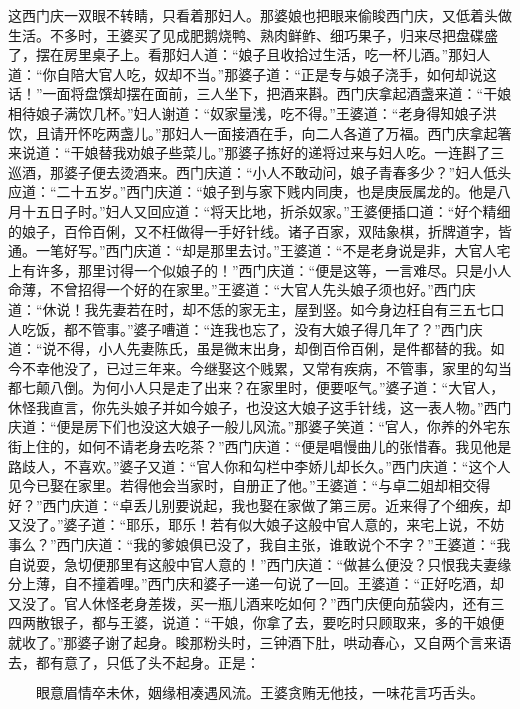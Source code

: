 这西门庆一双眼不转睛，只看着那妇人。那婆娘也把眼来偷睃西门庆，又低着头做生活。不多时，王婆买了见成肥鹅烧鸭、熟肉鲜鲊、细巧果子，归来尽把盘碟盛了，摆在房里桌子上。看那妇人道：“娘子且收拾过生活，吃一杯儿酒。”那妇人道：“你自陪大官人吃，奴却不当。”那婆子道：“正是专与娘子浇手，如何却说这话！”一面将盘馔却摆在面前，三人坐下，把酒来斟。西门庆拿起酒盏来道：“干娘相待娘子满饮几杯。”妇人谢道：“奴家量浅，吃不得。”王婆道：“老身得知娘子洪饮，且请开怀吃两盏儿。”那妇人一面接酒在手，向二人各道了万福。西门庆拿起箸来说道：“干娘替我劝娘子些菜儿。”那婆子拣好的递将过来与妇人吃。一连斟了三巡酒，那婆子便去烫酒来。西门庆道：“小人不敢动问，娘子青春多少？”妇人低头应道：“二十五岁。”西门庆道：“娘子到与家下贱内同庚，也是庚辰属龙的。他是八月十五日子时。”妇人又回应道：“将天比地，折杀奴家。”王婆便插口道：“好个精细的娘子，百伶百俐，又不枉做得一手好针线。诸子百家，双陆象棋，折牌道字，皆通。一笔好写。”西门庆道：“却是那里去讨。”王婆道：“不是老身说是非，大官人宅上有许多，那里讨得一个似娘子的！”西门庆道：“便是这等，一言难尽。只是小人命薄，不曾招得一个好的在家里。”王婆道：“大官人先头娘子须也好。”西门庆道：“休说！我先妻若在时，却不恁的家无主，屋到竖。如今身边枉自有三五七口人吃饭，都不管事。”婆子嘈道：“连我也忘了，没有大娘子得几年了？”西门庆道：“说不得，小人先妻陈氏，虽是微末出身，却倒百伶百俐，是件都替的我。如今不幸他没了，已过三年来。今继娶这个贱累，又常有疾病，不管事，家里的勾当都七颠八倒。为何小人只是走了出来？在家里时，便要呕气。”婆子道：“大官人，休怪我直言，你先头娘子并如今娘子，也没这大娘子这手针线，这一表人物。”西门庆道：“便是房下们也没这大娘子一般儿风流。”那婆子笑道：“官人，你养的外宅东街上住的，如何不请老身去吃茶？”西门庆道：“便是唱慢曲儿的张惜春。我见他是路歧人，不喜欢。”婆子又道：“官人你和勾栏中李娇儿却长久。”西门庆道：“这个人见今已娶在家里。若得他会当家时，自册正了他。”王婆道：“与卓二姐却相交得好？”西门庆道：“卓丢儿别要说起，我也娶在家做了第三房。近来得了个细疾，却又没了。”婆子道：“耶乐，耶乐！若有似大娘子这般中官人意的，来宅上说，不妨事么？”西门庆道：“我的爹娘俱已没了，我自主张，谁敢说个不字？”王婆道：“我自说耍，急切便那里有这般中官人意的！”西门庆道：“做甚么便没？只恨我夫妻缘分上薄，自不撞着哩。”西门庆和婆子一递一句说了一回。王婆道：“正好吃酒，却又没了。官人休怪老身差拨，买一瓶儿酒来吃如何？”西门庆便向茄袋内，还有三四两散银子，都与王婆，说道：“干娘，你拿了去，要吃时只顾取来，多的干娘便就收了。”那婆子谢了起身。睃那粉头时，三钟酒下肚，哄动春心，又自两个言来语去，都有意了，只低了头不起身。正是：

\[
眼意眉情卒未休，姻缘相凑遇风流。
王婆贪贿无他技，一味花言巧舌头。
\]
